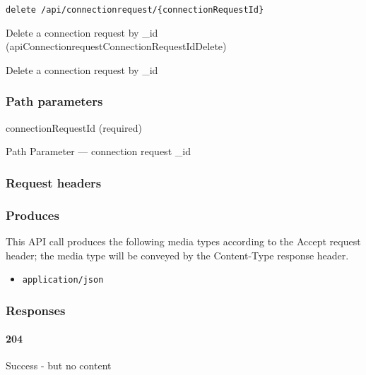 \protect\hypertarget{apiConnectionrequestConnectionRequestIdDelete}{}{}

\begin{verbatim}
delete /api/connectionrequest/{connectionRequestId}
\end{verbatim}

Delete a connection request by \_id
({apiConnectionrequestConnectionRequestIdDelete})

Delete a connection request by \_id

\hypertarget{path-parameters-86}{%
\subsubsection{Path parameters}\label{path-parameters-86}}

connectionRequestId (required)

{Path Parameter} --- connection request \_id

\hypertarget{request-headers-84}{%
\subsubsection{Request headers}\label{request-headers-84}}

\hypertarget{produces-154}{%
\subsubsection{Produces}\label{produces-154}}

This API call produces the following media types according to the
{Accept} request header; the media type will be conveyed by the
{Content-Type} response header.

\begin{itemize}
\tightlist
\item
  \texttt{application/json}
\end{itemize}

\hypertarget{responses-159}{%
\subsubsection{Responses}\label{responses-159}}

\hypertarget{section-512}{%
\paragraph{204}\label{section-512}}

Success - but no content \protect\hyperlink{}{}

